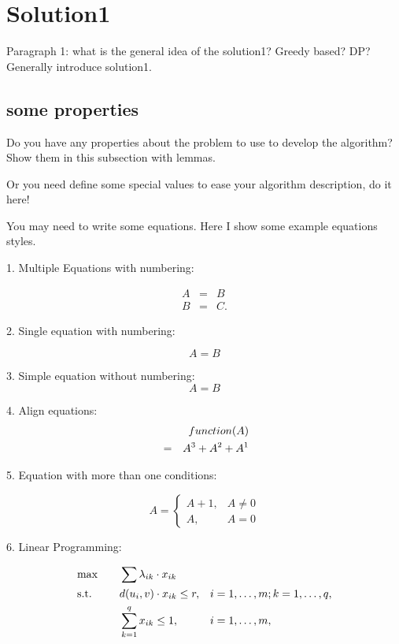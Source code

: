 \section{Solution1}
\label{sec:solution1}

Paragraph 1: what is the general idea of the solution1? Greedy based? DP? Generally introduce solution1.

\subsection{some properties}
Do you have any properties about the problem to use to develop the algorithm? Show them in this subsection with lemmas. 

Or you need define some special values to ease your algorithm description, do it here!


You may need to write some equations. Here I show some example equations styles.

1. Multiple Equations with numbering:

\begin{eqnarray}
A &=& B \label{eq:equation1}\\
B &=& C.\label{eq:equation2}
\end{eqnarray}

2. Single equation with numbering:

\begin{equation}
A = B \label{eq:equation3}
\end{equation}

3. Simple equation without numbering:
$$A = B$$

4. Align equations:
\begin{eqnarray}
&& function(A) \notag\\
&=& A^3 +  A^2 + A^1\label{eq:equation4}
\end{eqnarray}

5. Equation with more than one conditions:

\begin{equation}
A=\left\{
\begin{array}{ll}
A + 1, & A \neq 0 \\
A, & A = 0
\end{array}
\right. \label{eq:equation5}
\end{equation}

6. Linear Programming:

\begin{alignat}{2}
& \text{max}&  & \sum\lambda_{ik}\cdot x_{ik}\\
& \text{s.t.}&    \quad & 
\begin{aligned}[t]
&d(u_i, v)\cdot x_{ik} \leq r,    &&i =1, \dots, m; k = 1, \dots, q,\\
&\sum_{k=1}^{q} x_{ik} \leq 1,					 &&i =1, \dots, m,
\end{aligned}\notag
\end{alignat}

